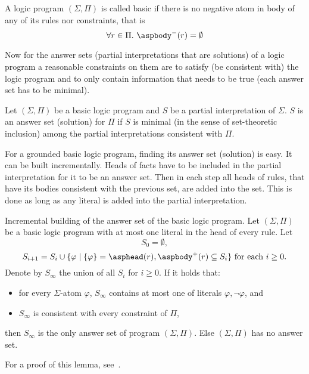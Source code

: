 \begin{definition}%
    \label{def:basic_logic_program}
    A logic program $(\Sigma, \Pi)$ is called basic if there is no negative atom
    in body of any of its rules nor constraints, that is
    \begin{equation*}
        \forall r\in \Pi.\ \aspbody^{-}(r) = \emptyset
    \end{equation*}
\end{definition}

Now for the answer sets (partial interpretations that are solutions)
of a logic program a reasonable constraints
on them are to satisfy (be consistent with) the logic program and to only contain
information that needs to be true (each answer set has to be minimal).

\begin{definition}\label{def:as_basic}
    Let $(\Sigma, \Pi)$ be a basic logic program and $S$ be a partial interpretation
    of $\Sigma$. $S$ is an answer set (solution) for $\Pi$ if $S$ is minimal
    (in the sense of set-theoretic inclusion) among the partial interpretations
    consistent with $\Pi$.
\end{definition}

For a grounded basic logic program, finding its answer set (solution)
is easy. It can be built incrementally.
Heads of facts have to be included in the partial interpretation for it to be
an answer set. Then in each step all heads of rules, that have its
bodies consistent with the previous set, are added into the set.
This is done as long as any literal is added into the partial interpretation.

\begin{lemma}{Incremental building of the answer set of the basic logic program.}%
    \label{lemma:incremental}
    Let $(\Sigma, \Pi)$ be a basic logic program with at most one literal
    in the head of every rule.
    Let
    \begin{equation*}
        S_0 = \emptyset,
    \end{equation*}
    \begin{equation*}
        S_{i+1} = S_{i}\cup \{\varphi \mid \{\varphi\} = \asphead(r), \aspbody^+(r) \subseteq S_i\} \text{ for each } i \geq 0.
    \end{equation*}
    Denote by $S_\infty$ the union of all $S_i$ for $i\geq 0$.
    If it holds that:
    \begin{itemize}
        \item for every $\Sigma$-atom $\varphi$, $S_\infty$ contains at most one
            of literals $\varphi, \neg\varphi$, and
        \item $S_\infty$ is consistent with every constraint of $\Pi$,
    \end{itemize}
    then $S_\infty$ is
    the only answer set of program $(\Sigma, \Pi)$. Else $(\Sigma, \Pi)$ has no answer set.

    For a proof of this lemma, see~.
\end{lemma}

